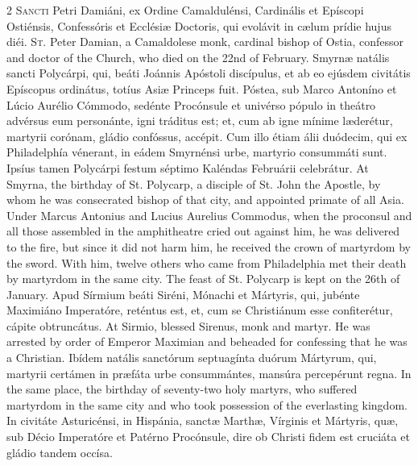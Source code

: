 \begin{paracol}{2}
\lettrine[lines=2]{S}{ancti} Petri Damiáni, ex Ordine Camaldulénsi, Cardinális et Epíscopi 
 Ostiénsis, Confessóris et Ecclésiæ Doctoris, 
 qui evolávit in cælum prídie hujus diéi.
\switchcolumn
{}
\lettrine[lines=2]{S}{t.} Peter Damian, a Camaldolese monk, cardinal bishop of Ostia, confessor 
 and doctor of the Church, who died on the 22nd of February.
\switchcolumn*
{}
Smyrnæ natális sancti Polycárpi, qui, beáti 
 Joánnis Apóstoli discípulus, et ab eo ejúsdem civitátis Epíscopus ordinátus, 
 totíus Asiæ Princeps fuit. Póstea, sub Marco Antoníno et Lúcio Aurélio 
 Cómmodo, sedénte Procónsule et univérso pópulo in theátro advérsus eum 
 personánte, igni tráditus est; et, cum ab igne mínime læderétur, martyrii 
 corónam, gládio confóssus, accépit. Cum illo étiam álii duódecim, qui 
 ex Philadelphía vénerant, in eádem Smyrnénsi urbe, martyrio consummáti sunt. 
 Ipsíus tamen Polycárpi festum séptimo Kaléndas Februárii celebrátur.
\switchcolumn
{}
At Smyrna, the birthday of St. Polycarp, a disciple of St. John the Apostle, 
 by whom he was consecrated bishop of that city, and appointed primate of all 
 Asia. Under Marcus Antonius and Lucius Aurelius Commodus, when the 
 proconsul and all those assembled in the amphitheatre cried out against him, 
 he was delivered to the fire, but since it did not harm him, he received the 
 crown of martyrdom by the sword. With him, twelve others who came from 
 Philadelphia met their death by martyrdom in the same city. The feast 
 of St. Polycarp is kept on the 26th of January.
\switchcolumn*
{}
Apud Sírmium beáti Siréni, Mónachi et Mártyris, qui, jubénte Maximiáno 
 Imperatóre, reténtus est, et, cum se Christiánum esse confiterétur, cápite 
 obtruncátus.
\switchcolumn
{}
At Sirmio, blessed Sirenus, monk and martyr. He was arrested by order 
 of Emperor Maximian and beheaded for confessing that he was a Christian.
\switchcolumn*
{}
Ibídem natális sanctórum septuagínta duórum Mártyrum, qui, martyrii certámen 
 in præfáta urbe consummántes, mansúra 
 percepérunt regna.
\switchcolumn
{}
In the same place, the birthday of seventy-two holy martyrs, who suffered 
 martyrdom in the same city and who took possession of the everlasting 
 kingdom.
\switchcolumn*
{}
In civitáte Asturicénsi, in Hispánia, sanctæ 
 Marthæ, Vírginis et Mártyris, quæ, sub Décio Imperatóre et Patérno 
 Procónsule, dire ob Christi fidem est cruciáta et gládio tandem occísa.

\end{paracol}
